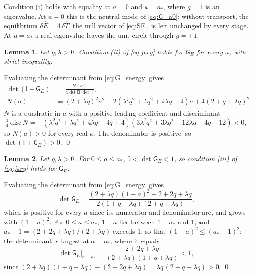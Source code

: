 \documentclass[preprint,12pt,authoryear]{elsarticle}
\newcommand{\tenI}{\mathsf{I}}
\newcommand{\tenG}{\mathsf{G}}
\providecommand{\tenB}{\mathsf{B}}
\newtheorem{lem}{Lemma}
\providecommand{\tenH}{\mathsf{H}}
\newcommand{\hE}{\hat{E}}
\newcommand{\hT}{\hat{T}}
\begin{document}
\begin{appendix}
Condition (i) holds with equality at $a = 0$ and $a = a_*$, where $g = 1$ is an eigenvalue. At $a = 0$ this is the neutral mode of \autoref{eq:G_a0}: without transport, the equilibrium $\delta\hE = 4\,\delta\hT$, the null vector of \autoref{eq:SE}, is left unchanged by every stage. At $a = a_*$ a real eigenvalue leaves the unit circle through $g = +1$.

\begin{lem}
\label{lem:cond_ii}
Let $q, \lambda > 0$. Condition (ii) of \autoref{eq:jury} holds for $\tenG_E$ for every $a$, with strict inequality.
\end{lem}

\begin{pf}
Evaluating the determinant from \autoref{eq:G_energy} gives
\begin{equation}
    \begin{split}
    \det\left(\tenI + \tenG_E\right) &= \frac{N(a)}{4\det\tenB\,\det\tenH}, \\
    N(a) &= \left(2 + \lambda q\right)^2 a^2 - 2\left(\lambda^2 q^2 + \lambda q^2 + 4\lambda q + 4\right) a + 4\left(2 + q + \lambda q\right)^2 .
    \end{split}
    \label{eq:detGplusI}
\end{equation}
$N$ is a quadratic in $a$ with a positive leading coefficient and discriminant
\begin{equation}
    \tfrac{1}{4}\,\mathrm{disc}\,N = -\left(\lambda^2 q^2 + \lambda q^2 + 4\lambda q + 4q + 4\right)\left(3\lambda^2 q^2 + 3\lambda q^2 + 12\lambda q + 4q + 12\right) < 0 ,
    \label{eq:discN}
\end{equation}
so $N(a) > 0$ for every real $a$. The denominator is positive, so $\det(\tenI + \tenG_E) > 0$. \qed
\end{pf}

\begin{lem}
\label{lem:cond_iii}
Let $q, \lambda > 0$. For $0 \leq a \leq a_*$, $0 < \det\tenG_E < 1$, so condition (iii) of \autoref{eq:jury} holds for $\tenG_E$.
\end{lem}

\begin{pf}
Evaluating the determinant from \autoref{eq:G_energy} gives
\begin{equation}
    \det\tenG_E = \frac{\left(2 + \lambda q\right)\left(1 - a\right)^2 + 2 + 2q + \lambda q}{2\left(1 + q + \lambda q\right)\left(2 + q + \lambda q\right)} ,
    \label{eq:detG_energy}
\end{equation}
which is positive for every $a$ since its numerator and denominator are, and grows with $(1 - a)^2$. For $0 \leq a \leq a_*$, $1 - a$ lies between $1 - a_*$ and 1, and $a_* - 1 = (2 + 2q + \lambda q)/(2 + \lambda q)$ exceeds 1, so that $(1 - a)^2 \leq (a_* - 1)^2$: the determinant is largest at $a = a_*$, where it equals
\begin{equation}
    \det\tenG_E\big|_{a = a_*} = \frac{2 + 2q + \lambda q}{\left(2 + \lambda q\right)\left(1 + q + \lambda q\right)} < 1,
    \label{eq:detG_astar}
\end{equation}
since $(2 + \lambda q)(1 + q + \lambda q) - (2 + 2q + \lambda q) = \lambda q\,(2 + q + \lambda q) > 0$. \qed
\end{pf}


\end{appendix}
\end{document}
